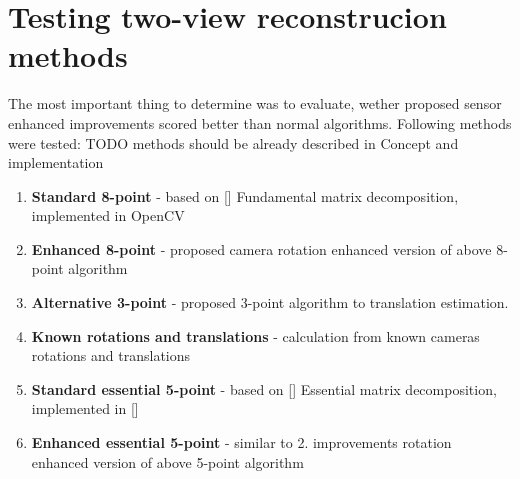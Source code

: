 \section{Testing two-view reconstrucion methods} \label{sec:Testin2Views}
The most important thing to determine was to evaluate, wether proposed sensor enhanced improvements scored better than normal algorithms.
Following methods were tested: TODO methods should be already described in Concept and implementation
\begin{enumerate}
\item \textbf{Standard 8-point} - based on [] Fundamental matrix decomposition, implemented in OpenCV
\item \textbf{Enhanced 8-point} - proposed camera rotation enhanced version of above 8-point algorithm
\item \textbf{Alternative 3-point} - proposed 3-point algorithm to translation estimation.
\item \textbf{Known rotations and translations} - calculation from known cameras rotations and translations
\item \textbf{Standard essential 5-point} - based on [] Essential matrix decomposition, implemented in []
\item \textbf{Enhanced essential 5-point} - similar to 2. improvements rotation enhanced version of above 5-point algorithm
\end{enumerate}
